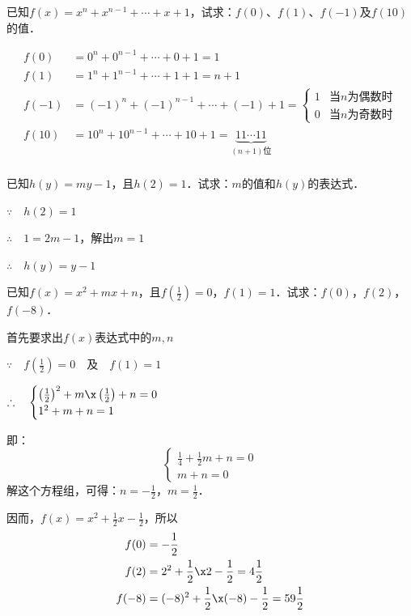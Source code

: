\begin{example}
已知$f(x)=x^n+x^{n-1}+\cdots+x+1$，试求：$f(0)$、$f(1)$、$f(-1)$及$f(10)$的值．
\end{example}

\begin{solution}
\[\begin{split}
    f(0)&=0^n+0^{n-1}+\cdots +0+1=1\\
    f(1)&=1^n+1^{n-1}+\cdots +1+1=n+1\\
    f(-1)&=(-1)^n+(-1)^{n-1}+\cdots +(-1)+1=\begin{cases}
        1   & \text{当$n$为偶数时} \\
        0  &  \text{当$n$为奇数时}
    \end{cases}\\
    f(10)&=10^n+10^{n-1}+\cdots +10+1=\underbrace{11\cdots 11}_{(n+1)\text{位}} \\
\end{split}\]       
    
\end{solution}


\begin{example}
已知$h(y)=my-1$，且$h(2)=1$．试求：$m$的值和$h(y)$的表达式．
\end{example}

\begin{solution}
        $\because\quad h(2)=1$ 

$\therefore\quad 1=2m-1$，解出$m=1$

        $\therefore\quad h(y)=y-1$    
\end{solution}


\begin{example}
已知$f(x)=x^2+mx+n$，且$f\left(\frac{1}{2}\right)=0$，$f(1)=1$．试求：$f(0)$，$f(2)$，$f(-8)$．
\end{example}

\begin{solution}
   首先要求出$f(x)$表达式中的$m,n$
   
   $\because\quad f\left(\frac{1}{2}\right)=0\quad \text{及}\quad f(1)=1$

   $\therefore\quad \begin{cases}
    \left(\frac{1}{2}\right)^2+m\x \left(\frac{1}{2}\right)+n=0\\
    1^2+m+n=1
   \end{cases}$

即：    
\[\begin{cases}
    \frac{1}{4}+\frac{1}{2}m+n=0\\
    m+n=0
\end{cases} \]
解这个方程组，可得：$n=-\frac{1}{2}$，$m=\frac{1}{2}$．

因而，$f(x)=x^2+\frac{1}{2}x-\frac{1}{2}$，所以
\[\begin{split}
    f(0)&= -\frac{1}{2}\\
    f(2)&=2^2+\frac{1}{2}\x 2-\frac{1}{2}=4\frac{1}{2}\\
    f(-8)&=(-8)^2+\frac{1}{2}\x (-8)-\frac{1}{2}=59\frac{1}{2}
\end{split}\]
\end{solution}

